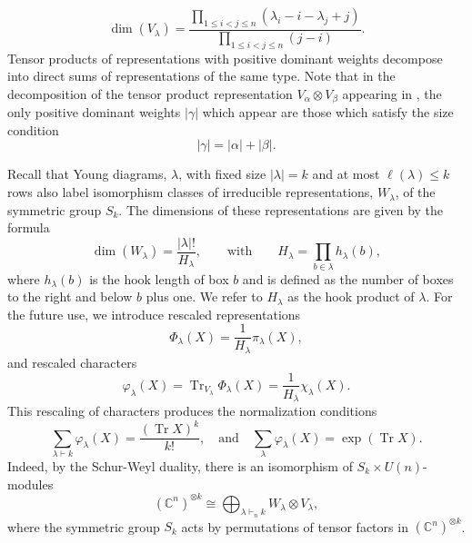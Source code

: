 \documentclass[notitlepage, 11pt, letterpaper]{amsart}
\theoremstyle{plain}
\theoremstyle{definition}
\let\cref\crtcref
\DeclareMathOperator{\Tr}{Tr}
\newcommand{\ot}{\otimes} %
\newcommand{\vp}{\varphi} %
\newcommand{\ya}{\alpha}
\newcommand{\yb}{\beta}
\newcommand{\yc}{\gamma}
\newcommand{\yx}{\lambda}
\newcommand{\sya}{|\ya|}
\newcommand{\syb}{|\yb|}
\newcommand{\syc}{|\yc|}
\newcommand{\syx}{|\yx|}
\begin{document}
\begin{equation}
    \label{eq:weyl_dim}
    \dim(V_{\yx}) = \frac{\prod_{1 \leq i<j \leq n}(\yx_i - i - \yx_j + j)}{\prod_{1 \leq i<j \leq n}(j-i)}.
\end{equation}
Tensor products of representations with positive dominant weights decompose into direct sums of representations of the same type.
Note that in the decomposition of the tensor product representation $V_{\ya}\ot V_{\yb}$ appearing in \cref{eq:tensor_product}, the only positive dominant weights $\syc$ which appear are those which satisfy the size condition
\begin{equation}
    \label{eq:size_condition_tri}
    \syc = \sya + \syb.
\end{equation}

Recall that Young diagrams, $\yx$, with fixed size $\syx=k$ and at most $\ell(\yx) \leq k$ rows also label isomorphism classes of irreducible representations, $W_\yx$, of the symmetric group $S_k$.
The dimensions of these representations are given by the formula
\begin{equation}
    \label{eq:dim_W_hook_product}
    \dim(W_\yx) = \frac{\syx!}{H_{\yx}},
    \qquad
    \text{with}
    \qquad
    H_{\yx} = \prod_{b \in \yx} h_\yx(b),
\end{equation}
where $h_\yx(b)$ is the hook length of box $b$ and is defined as the number of boxes to the right and below $b$ plus one.
We refer to $H_{\yx}$ as the hook product of $\yx$.
For the future use, we introduce rescaled representations
\begin{equation}
    \Phi_\yx(X) = \frac{1}{H_{\yx}} \pi_\yx(X),
\end{equation}
and rescaled characters
\begin{equation}
    \vp_\yx(X) = \Tr_{V_\yx}  \Phi_\yx(X) = \frac{1}{H_{\yx}}  \chi_\yx(X).
\end{equation}
This rescaling of characters produces the normalization conditions
\begin{equation}
    \label{eq:varphi_normalization}
    \sum_{\yx \vdash k} \vp_\yx(X) = \frac{(\Tr X)^k}{k!},
    \quad \text{and} \quad
    \sum_\yx \vp_\yx(X) = \exp(\Tr X).
\end{equation}
Indeed, by the Schur-Weyl duality, there is an isomorphism of $S_k \times U(n)$-modules
\begin{equation}
    \label{eq:schur-weyl}
    (\mathbb{C}^n)^{\ot k} \cong \bigoplus_{\yx \vdash_{n} k} W_\yx \ot V_\yx,
\end{equation}
where the symmetric group $S_k$ acts by permutations of tensor factors in $(\mathbb{C}^n)^{\ot k}$.
\end{document}

